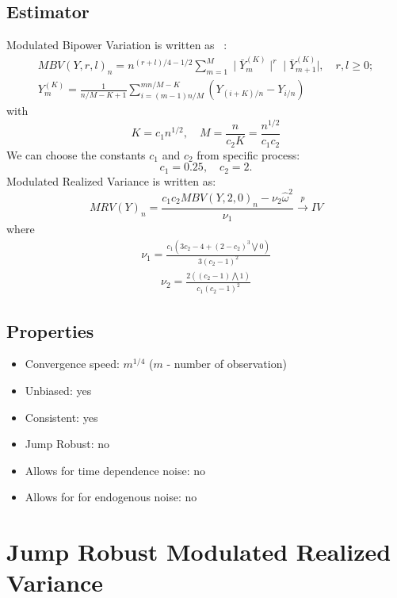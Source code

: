 \documentclass[letterpaper]{report}
\begin{document}
\subsection{Estimator}
Modulated Bipower Variation is written as ~\cite[Podolskij and Vetter, 2009]{Podolskij_Vetter}:
\begin{gather}
\label{MBV}
MBV(Y,r,l)_n = n^{(r+l)/4-1/2}\sum_{m=1}^M \mid \bar{Y}_m^{(K)}\mid^r \mid
\bar{Y}_{m+1}^{(K)}\mid, \quad r,l \geq 0;\\
Y_m^{(K)}=\frac{1}{n/M-K+1}\sum_{i=(m-1)n/M}^{mn/M-K}(Y_{(i+K)/n}-Y_{i/n})
\end{gather}
with
\begin{equation}
K=c_1 n^{1/2}, \quad M=\frac{n}{c_2K}=\frac{n^{1/2}}{c_1c_2}
\end{equation}
We can choose the constants $c_1$ and $c_2$ from specific process:
\begin{equation}
c_1 = 0.25, \quad
c_2 = 2.
\end{equation}
\noindent Modulated Realized Variance is written as:
\begin{equation}
MRV(Y)_n = \frac{c_1 c_2 MBV(Y,2,0)_n -\nu_2 \hat{\omega}^2}{\nu_1} \stackrel{p}{\to} IV
\end{equation}
where
\begin{gather}
\nu_1 = \frac{c_1(3c_2-4+(2-c_2)^3\bigvee 0)}{3(c_2-1)^2}
\end{gather}
\begin{gather}
\nu_2 = \frac{2((c_2-1)\bigwedge 1)}{c_1(c_2-1)^2}
\end{gather}
\subsection{Properties}
\begin{itemize}
\item Convergence speed: $m^{1/4}$ ($m$ - number of observation)
\item Unbiased: yes
\item Consistent: yes
\item Jump Robust: no
\item Allows for time dependence noise: no
\item Allows for for endogenous noise: no
\end{itemize}
 

\section{Jump Robust Modulated Realized Variance}
\end{document}
